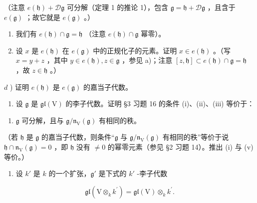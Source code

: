 （注意 \(e(\mathfrak{h}) + \mathcal{D}\mathfrak{g}\) 可分解（定理 1 的推论 1），包含 \(\mathfrak{g} = \mathfrak{h} + \mathcal{D}\mathfrak{g}\) ，且含于 \(e(\mathfrak{g})\) ；故它就是 \(e(\mathfrak{g})\) 。）

\begin{enumerate}
\def\labelenumi{\alph{enumi})}
\setcounter{enumi}{1}
\item
  我们有 \(e(\mathfrak{h}) \cap \mathfrak{g} = \mathfrak{h}\) （注意 \(e(\mathfrak{h}) \cap \mathfrak{g}\) 幂零）。
\item
  设 \(x\) 是 \(e(\mathfrak{h})\) 在 \(e(\mathfrak{g})\) 中的正规化子的元素。证明 \(x \in e(\mathfrak{h})\) 。（写 \(x = y + z\) ，其中 \(y \in e(\mathfrak{h}), z \in \mathfrak{g}\) ，参见 a)；注意 \([z, \mathfrak{h}] \subset e(\mathfrak{h}) \cap \mathfrak{g} = \mathfrak{h}\) ，故 \(z \in \mathfrak{h}\) 。）
\end{enumerate}

\(d\) ) 证明 \(e(\mathfrak{h})\) 是 \(e(\mathfrak{g})\) 的嘉当子代数。

\begin{enumerate}
\def\labelenumi{\arabic{enumi})}
\setcounter{enumi}{8}
\tightlist
\item
  设 \(\mathfrak{g}\) 是 \(\mathfrak{gl}(\mathrm{V})\) 的李子代数。证明 §3 习题 16 的条件 (i)、(ii)、(iii) 等价于：
\end{enumerate}

\begin{enumerate}
\def\labelenumi{(\alph{enumi})}
\setcounter{enumi}{21}
\tightlist
\item
  \(\mathfrak{g}\) 可分解，且与 \(\mathfrak{g} / \mathfrak{n}_{\mathrm{V}}(\mathfrak{g})\) 有相同的秩。
\end{enumerate}

（若 \(\mathfrak{h}\) 是 \(\mathfrak{g}\) 的嘉当子代数，则条件“\(\mathfrak{g}\) 与 \(\mathfrak{g}/\mathfrak{n}_{\mathrm{V}}(\mathfrak{g})\) 有相同的秩”等价于说 \(\mathfrak{h} \cap \mathfrak{n}_{\mathrm{V}}(\mathfrak{g}) = 0\) ，即 \(\mathfrak{h}\) 没有 \(\neq 0\) 的幂零元素（参见 §2 习题 14）。推出 (i) 与 (v) 等价。）

\begin{enumerate}
\def\labelenumi{\arabic{enumi})}
\setcounter{enumi}{9}
\tightlist
\item
  设 \(k'\) 是 \(k\) 的一个扩张，\(\mathfrak{g}'\) 是下式的 \(k'\) -李子代数
\end{enumerate}

\[
\mathfrak {g l} (\mathrm{V} \otimes_ {k} k ^ {\prime}) = \mathfrak {g l} (\mathrm{V}) \otimes_ {k} k ^ {\prime}.
\]


